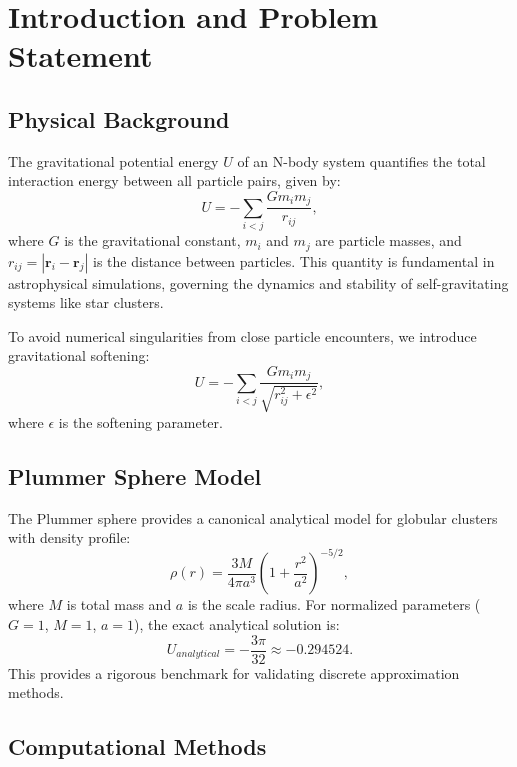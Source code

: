\documentclass[11pt,a4paper]{article}
\begin{document}
\section{Introduction and Problem Statement}

\subsection{Physical Background}

The gravitational potential energy $U$ of an N-body system quantifies the total interaction energy between all particle pairs, given by:
\begin{equation}\label{eq:potential}
U = -\sum_{i < j} \frac{G m_i m_j}{r_{ij}},
\end{equation}
where $G$ is the gravitational constant, $m_i$ and $m_j$ are particle masses, and $r_{ij} = |\mathbf{r}_i - \mathbf{r}_j|$ is the distance between particles. This quantity is fundamental in astrophysical simulations, governing the dynamics and stability of self-gravitating systems like star clusters.

To avoid numerical singularities from close particle encounters, we introduce gravitational softening:
\begin{equation}\label{eq:softened_potential}
U = -\sum_{i < j} \frac{G m_i m_j}{\sqrt{r_{ij}^2 + \epsilon^2}},
\end{equation}
where $\epsilon$ is the softening parameter.

\subsection{Plummer Sphere Model}

The Plummer sphere provides a canonical analytical model for globular clusters with density profile:
\begin{equation}\label{eq:plummer_density}
\rho(r) = \frac{3M}{4\pi a^3} \left(1 + \frac{r^2}{a^2}\right)^{-5/2},
\end{equation}
where $M$ is total mass and $a$ is the scale radius. For normalized parameters ($G=1$, $M=1$, $a=1$), the exact analytical solution is:
\begin{equation}\label{eq:analytical_U}
U_{analytical} = -\frac{3\pi}{32} \approx -0.294524.
\end{equation}
This provides a rigorous benchmark for validating discrete approximation methods.

\subsection{Computational Methods}
\end{document}
